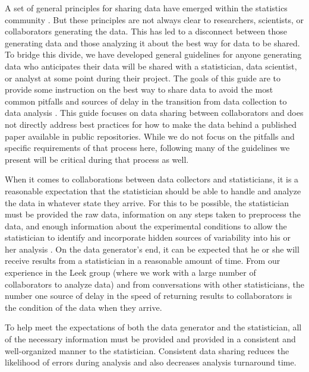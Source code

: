 \documentclass[12pt]{article}
\begin{document}
A set of general principles for sharing data have emerged within the
statistics community
\citep[\citet{_tidy_data},\citet{wilson_good_2016},\citet{white_nine_2013}]{_data_org}.
But these principles are not always clear to researchers, scientists, or
collaborators generating the data. This has led to a disconnect between
those generating data and those analyzing it about the best way for data
to be shared. To bridge this divide, we have developed general
guidelines for anyone generating data who anticipates their data will be
shared with a statistician, data scientist, or analyst at some point
during their project. The goals of this guide are to provide some
instruction on the best way to share data to avoid the most common
pitfalls and sources of delay in the transition from data collection to
data analysis \citep{leek2015opinion}. This guide focuses on data
sharing between collaborators and does not directly address best
practices for how to make the data behind a published paper available in
public repositories. While we do not focus on the pitfalls and specific
requirements of that process here, following many of the guidelines we
present will be critical during that process as well.

When it comes to collaborations between data collectors and
statisticians, it is a reasonable expectation that the statistician
should be able to handle and analyze the data in whatever state they
arrive. For this to be possible, the statistician must be provided the
raw data, information on any steps taken to preprocess the data, and
enough information about the experimental conditions to allow the
statistician to identify and incorporate hidden sources of variability
into his or her analysis \citep{baggerly2010disclose}. On the data
generator's end, it can be expected that he or she will receive results
from a statistician in a reasonable amount of time. From our experience
in the Leek group \citep{_jtleek} (where we work with a large number of
collaborators to analyze data) and from conversations with other
statisticians, the number one source of delay in the speed of returning
results to collaborators is the condition of the data when they arrive.

To help meet the expectations of both the data generator and the
statistician, all of the necessary information must be provided and
provided in a consistent and well-organized manner to the statistician.
Consistent data sharing reduces the likelihood of errors during analysis
and also decreases analysis turnaround time.
\end{document}
